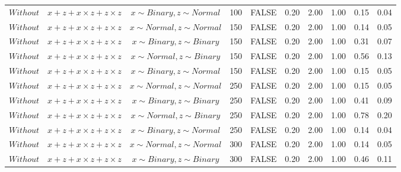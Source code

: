\begin{longtable}{lccccccccc}
  $Without$ & $\textit{x} + \textit{z} + \textit{x} \times \textit{z} + \textit{z} \times \textit{z}$ & $\textit{x} \sim Binary, \textit{z} \sim Normal$ & 100 & FALSE & 0.20 & 2.00 & 1.00 & 0.15 & 0.04 \\ 
  $Without$ & $\textit{x} + \textit{z} + \textit{x} \times \textit{z} + \textit{z} \times \textit{z}$ & $\textit{x} \sim Normal , \textit{z} \sim Normal$ & 150 & FALSE & 0.20 & 2.00 & 1.00 & 0.14 & 0.05 \\ 
  $Without$ & $\textit{x} + \textit{z} + \textit{x} \times \textit{z} + \textit{z} \times \textit{z}$ & $\textit{x} \sim Binary, \textit{z} \sim Binary$ & 150 & FALSE & 0.20 & 2.00 & 1.00 & 0.31 & 0.07 \\ 
  $Without$ & $\textit{x} + \textit{z} + \textit{x} \times \textit{z} + \textit{z} \times \textit{z}$ & $\textit{x} \sim Normal, \textit{z} \sim Binary$ & 150 & FALSE & 0.20 & 2.00 & 1.00 & 0.56 & 0.13 \\ 
  $Without$ & $\textit{x} + \textit{z} + \textit{x} \times \textit{z} + \textit{z} \times \textit{z}$ & $\textit{x} \sim Binary, \textit{z} \sim Normal$ & 150 & FALSE & 0.20 & 2.00 & 1.00 & 0.15 & 0.05 \\ 
  $Without$ & $\textit{x} + \textit{z} + \textit{x} \times \textit{z} + \textit{z} \times \textit{z}$ & $\textit{x} \sim Normal , \textit{z} \sim Normal$ & 250 & FALSE & 0.20 & 2.00 & 1.00 & 0.15 & 0.05 \\ 
  $Without$ & $\textit{x} + \textit{z} + \textit{x} \times \textit{z} + \textit{z} \times \textit{z}$ & $\textit{x} \sim Binary, \textit{z} \sim Binary$ & 250 & FALSE & 0.20 & 2.00 & 1.00 & 0.41 & 0.09 \\ 
  $Without$ & $\textit{x} + \textit{z} + \textit{x} \times \textit{z} + \textit{z} \times \textit{z}$ & $\textit{x} \sim Normal, \textit{z} \sim Binary$ & 250 & FALSE & 0.20 & 2.00 & 1.00 & 0.78 & 0.20 \\ 
  $Without$ & $\textit{x} + \textit{z} + \textit{x} \times \textit{z} + \textit{z} \times \textit{z}$ & $\textit{x} \sim Binary, \textit{z} \sim Normal$ & 250 & FALSE & 0.20 & 2.00 & 1.00 & 0.14 & 0.04 \\ 
  $Without$ & $\textit{x} + \textit{z} + \textit{x} \times \textit{z} + \textit{z} \times \textit{z}$ & $\textit{x} \sim Normal , \textit{z} \sim Normal$ & 300 & FALSE & 0.20 & 2.00 & 1.00 & 0.14 & 0.05 \\ 
  $Without$ & $\textit{x} + \textit{z} + \textit{x} \times \textit{z} + \textit{z} \times \textit{z}$ & $\textit{x} \sim Binary, \textit{z} \sim Binary$ & 300 & FALSE & 0.20 & 2.00 & 1.00 & 0.46 & 0.11 \\ 

\end{longtable}
